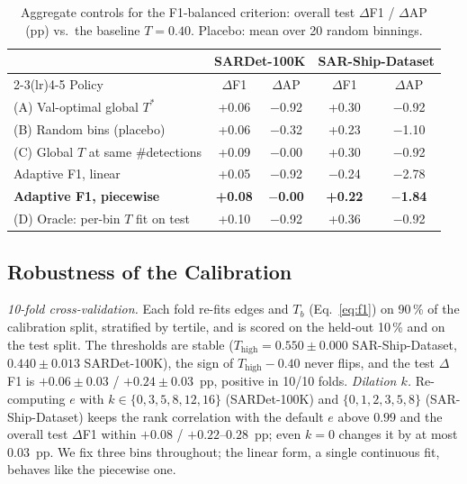 \documentclass[journal]{IEEEtran}
\providecommand{\linelabel}[1]{}
\begin{document}
\begin{table}[t]
\centering
\caption{Aggregate controls for the F1-balanced criterion: overall test
$\Delta$F1 / $\Delta$AP (pp) vs.\ the baseline $T{=}0.40$. Placebo: mean
over 20 random binnings.}
\label{tab:controls}
\footnotesize
\setlength{\tabcolsep}{3.5pt}
\begin{tabular}{l c c c c}
\toprule
 & \multicolumn{2}{c}{SARDet-100K} & \multicolumn{2}{c}{SAR-Ship-Dataset} \\
\cmidrule(lr){2-3}\cmidrule(lr){4-5}
Policy & $\Delta$F1 & $\Delta$AP & $\Delta$F1 & $\Delta$AP \\
\midrule
(A) Val-optimal global $T^{*}$          & +0.06 & $-$0.92 & +0.30 & $-$0.92 \\
(B) Random bins (placebo)               & +0.06 & $-$0.32 & +0.23 & $-$1.10 \\
(C) Global $T$ at same \#detections     & +0.09 & $-$0.00 & +0.30 & $-$0.92 \\
Adaptive F1, linear                     & +0.05 & $-$0.92 & $-$0.24 & $-$2.78 \\
\textbf{Adaptive F1, piecewise}         & \textbf{+0.08} & \textbf{$-$0.00} & \textbf{+0.22} & \textbf{$-$1.84} \\
(D) Oracle: per-bin $T$ fit on test     & +0.10 & $-$0.92 & +0.36 & $-$0.92 \\
\bottomrule
\end{tabular}
\end{table}

\subsection{Robustness of the Calibration}
\label{sec:robust}
\linelabel{ln:cv}\emph{10-fold cross-validation.} Each fold re-fits edges and $T_b$
(Eq.~\eqref{eq:f1}) on 90\,\% of the calibration split, stratified by
tertile, and is scored on the held-out 10\,\% and on the test split. The
thresholds are stable ($T_{\text{high}}{=}0.550\pm0.000$
SAR-Ship-Dataset, $0.440\pm0.013$ SARDet-100K), the sign of
$T_{\text{high}}-0.40$ never flips, and the test $\Delta$F1 is
$+0.06\pm0.03$ / $+0.24\pm0.03$~pp, positive in 10/10 folds.\linelabel{ln:cvend}
\linelabel{ln:ksweep}\emph{Dilation $k$.} Re-computing $e$ with $k\in\{0,3,5,8,12,16\}$
(SARDet-100K) and $\{0,1,2,3,5,8\}$ (SAR-Ship-Dataset) keeps the rank
correlation with the default $e$ above $0.99$ and the overall test
$\Delta$F1 within $+0.08$ / $+0.22$--$0.28$~pp; even $k{=}0$ changes it by
at most $0.03$~pp. We fix three bins throughout; the linear form, a single
continuous fit, behaves like the piecewise one.\linelabel{ln:ksweepend}
\end{document}
